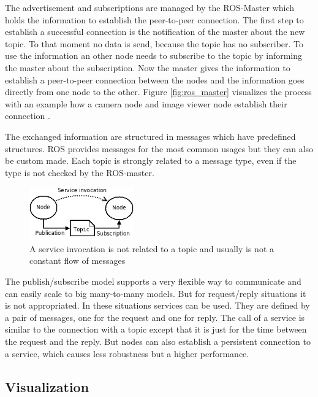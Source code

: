The advertisement and subscriptions are managed by the ROS-Master which holds the information to establish the peer-to-peer connection.
The first step to establish a successful connection is the notification of the master about the new topic.
To that moment no data is send, because the topic has no subscriber.
To use the information an other node needs to subscribe to the topic by informing the master about the subscription.
Now the master gives the information to establish a peer-to-peer connection between the nodes and the information goes directly from one node to the other.
Figure \ref{fig:ros_master} visualizes the process with an example how a camera node and image viewer node establish their connection \cite{rosMaster}.

The exchanged information are structured in messages which have predefined structures.
ROS provides messages for the most common usages but they can also be custom made.
Each topic is strongly related to a message type, even if the type is not checked by the ROS-master.

\begin{figure}
    \centering
    \includegraphics[width=0.4\textwidth]{img/ros_master/service.png}

    \caption{A service invocation is not related to a topic and usually is not a constant flow of messages}
    \label{fig:service_invocation}
\end{figure}

The publish/subscribe model supports a very flexible way to communicate and can easily scale to big many-to-many models.
But for request/reply situations it is not appropriated.
In these situations services can be used.
They are defined by a pair of messages, one for the request and one for reply.
The call of a service is similar to the connection with a topic except that it is just for the time between the request and the reply.
But nodes can also establish a persistent connection to a service, which causes less robustness but a higher performance.

\subsection{Visualization}\label{ssec:visualization}

